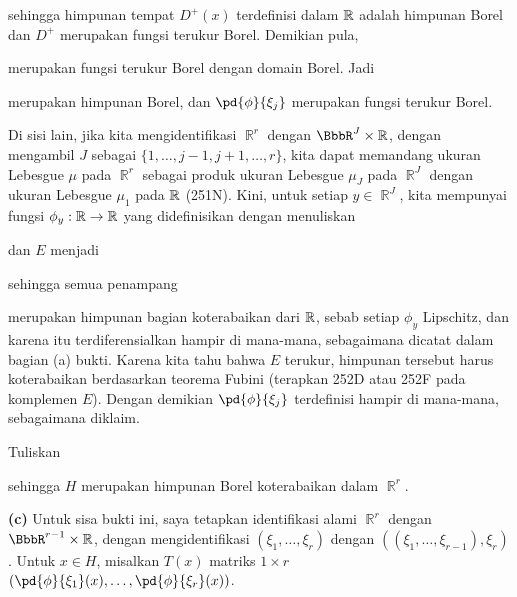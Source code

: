 {\noindent sehingga himpunan tempat $D^+(x)$ terdefinisi dalam $\Bbb R$
adalah himpunan Borel dan $D^+$ merupakan fungsi terukur Borel. Demikian
pula,


\noindent merupakan fungsi terukur Borel dengan domain Borel.   Jadi


\noindent merupakan himpunan Borel, dan $\pd{\phi}{\xi_j}$ merupakan
fungsi terukur Borel.

Di sisi lain, jika kita mengidentifikasi $\BbbR^r$ dengan
$\BbbR^J\times\Bbb R$, dengan mengambil $J$ sebagai
$\{1,\ldots,j-1,j+1,\ldots,r\}$, kita dapat memandang ukuran Lebesgue
$\mu$ pada $\BbbR^r$ sebagai produk ukuran Lebesgue $\mu_J$ pada
$\BbbR^J$ dengan ukuran Lebesgue $\mu_1$ pada $\Bbb R$ (251N). Kini,
untuk setiap $y\in\BbbR^J$, kita mempunyai fungsi
$\phi_y:\Bbb R\to\Bbb R$ yang didefinisikan dengan menuliskan


\noindent dan $E$ menjadi


\noindent sehingga semua penampang


\noindent merupakan himpunan bagian koterabaikan dari $\Bbb R$, sebab
setiap $\phi_y$ Lipschitz, dan karena itu terdiferensialkan hampir di
mana-mana, sebagaimana dicatat dalam bagian (a) bukti. Karena kita tahu
bahwa $E$ terukur, himpunan tersebut harus koterabaikan berdasarkan teorema
Fubini (terapkan 252D atau 252F pada komplemen $E$). Dengan demikian
$\pd{\phi}{\xi_j}$ terdefinisi hampir di mana-mana, sebagaimana
diklaim.\ \Qed

Tuliskan


\noindent sehingga $H$ merupakan himpunan Borel koterabaikan dalam
$\BbbR^r$.

\medskip

{\bf (c)} Untuk sisa bukti ini, saya tetapkan identifikasi alami
$\BbbR^r$ dengan $\BbbR^{r-1}\times\Bbb R$, dengan mengidentifikasi
$(\xi_1,\ldots,\xi_r)$ dengan $((\xi_1,\ldots,\xi_{r-1}),\xi_r)$.
Untuk $x\in H$, misalkan $T(x)$ matriks $1\times r$
$(\pd{\phi}{\xi_1}(x),\ldots,\pd{\phi}{\xi_r}(x))$.

}
